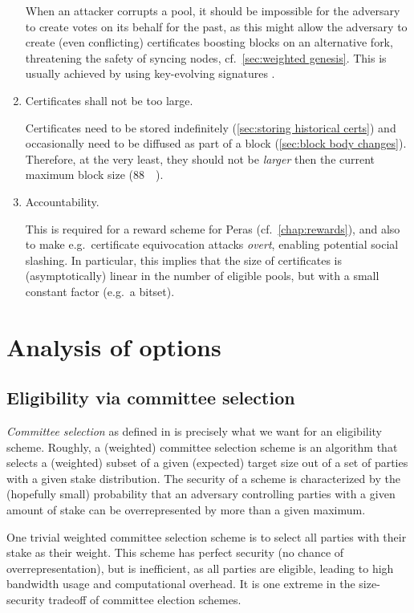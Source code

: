 \begin{enumerate}
  When an attacker corrupts a pool, it should be impossible for the adversary to create votes on its behalf for the past, as this might allow the adversary to create (even conflicting) certificates boosting blocks on an alternative fork, threatening the safety of syncing nodes, cf.~\cref{sec:weighted genesis}.
  This is usually achieved by using key-evolving signatures \parencite{bellare1999forward}.
\item
  Certificates shall not be too large.

  Certificates need to be stored indefinitely (\cref{sec:storing historical certs}) and occasionally need to be diffused as part of a block (\cref{sec:block body changes}).
  Therefore, at the very least, they should not be \emph{larger} then the current maximum block size (\qty{88}{\kibi\byte}).
\item
  Accountability.

  This is required for a reward scheme for Peras (cf.\ \cref{chap:rewards}), and also to make e.g.\ certificate equivocation attacks \emph{overt}, enabling potential social slashing.
  In particular, this implies that the size of certificates is (asymptotically) linear in the number of eligible pools, but with a small constant factor (e.g.\ a bitset).
\end{enumerate}

\section{Analysis of options}

\subsection{Eligibility via committee selection}

\emph{Committee selection} as defined in \cite{gavzi2023fait} is precisely what we want for an eligibility scheme.
Roughly, a (weighted) committee selection scheme is an algorithm that selects a (weighted) subset of a given (expected) target size out of a set of parties with a given stake distribution.
The security of a scheme is characterized by the (hopefully small) probability that an adversary controlling parties with a given amount of stake can be overrepresented by more than a given maximum.

One trivial weighted committee selection scheme is to select all parties with their stake as their weight.
This scheme has perfect security (no chance of overrepresentation), but is inefficient, as all parties are eligible, leading to high bandwidth usage and computational overhead.
It is one extreme in the size-security tradeoff of committee election schemes.

